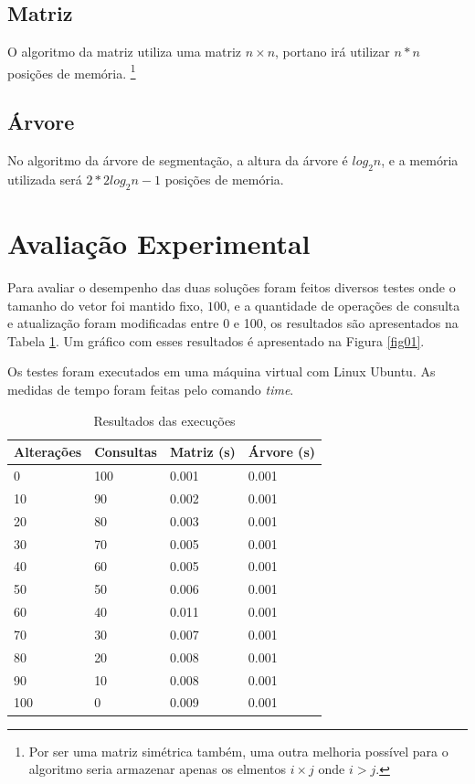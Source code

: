 \documentclass[10pt,a4paper]{article}
\begin{document}
    \subsection{Matriz}

    O algoritmo da matriz utiliza uma matriz $n \times n$, portano irá utilizar $n * n$ posições de memória.
    \footnote{Por ser uma matriz simétrica também, uma outra melhoria possível para o algoritmo seria armazenar apenas os elmentos $i \times j$ onde $i > j$.}

    \subsection{Árvore}

    No algoritmo da árvore de segmentação, a altura da árvore é $log_2 n$, e a memória utilizada será $2 * 2 log_2 n - 1$ posições de memória.

	\section{Avaliação Experimental}

	Para avaliar o desempenho das duas soluções foram feitos diversos testes onde o tamanho do vetor foi mantido fixo, $100$, e a quantidade de operações de consulta e atualização foram modificadas entre 0 e 100, os resultados são apresentados na Tabela \ref{tab01}. Um gráfico com esses resultados é apresentado na Figura \ref{fig01}.
    
	Os testes foram executados em uma máquina virtual com Linux Ubuntu. As medidas de tempo foram feitas pelo comando \textit{time}.

	\begin{table}[H]
		\centering
		\caption{Resultados das execuções}
		\label{tab01}
		\begin{tabular}{@{}llll@{}}
			\toprule 
			Alterações & Consultas & Matriz (s) & Árvore (s) \\ \midrule
			0 & 100 & 0.001  & 0.001 \\
			10 & 90 & 0.002 &  0.001 \\
			20 & 80 & 0.003 &  0.001 \\
			30 & 70 & 0.005 &  0.001 \\
			40 & 60 & 0.005 &  0.001 \\
			50 & 50 & 0.006 &  0.001 \\
			60 & 40 & 0.011 &  0.001 \\
			70 & 30 & 0.007 &  0.001 \\
			80 & 20 & 0.008 &  0.001 \\
			90 & 10 & 0.008 &  0.001 \\
			100 & 0 & 0.009 &  0.001 \\ \bottomrule
		\end{tabular}
	\end{table}
\end{document}
